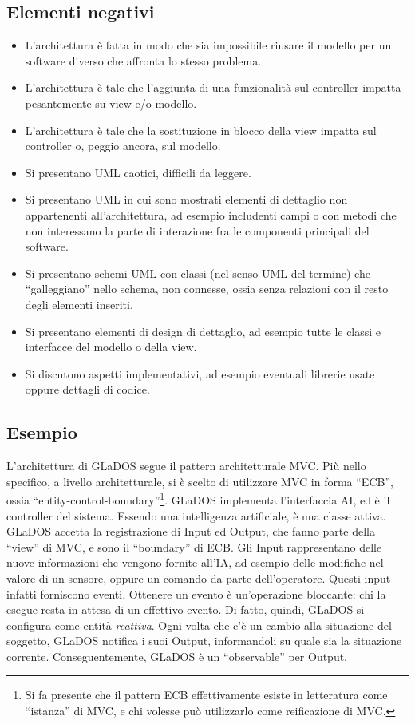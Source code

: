 \documentclass[a4paper,12pt]{report}
\begin{document}
\subsection*{Elementi negativi}
\begin{itemize}
 \item L'architettura è fatta in modo che sia impossibile riusare il modello per un software diverso che affronta lo stesso problema.
 \item L'architettura è tale che l'aggiunta di una funzionalità sul controller impatta pesantemente su view e/o modello.
 \item L'architettura è tale che la sostituzione in blocco della view impatta sul controller o, peggio ancora, sul modello.
 \item Si presentano UML caotici, difficili da leggere.
 \item Si presentano UML in cui sono mostrati elementi di dettaglio non appartenenti all'architettura, ad esempio includenti campi o con metodi che non interessano la parte di interazione fra le componenti principali del software.
 \item Si presentano schemi UML con classi (nel senso UML del termine) che ``galleggiano'' nello schema, non connesse, ossia senza relazioni con il resto degli elementi inseriti.
 \item Si presentano elementi di design di dettaglio, ad esempio tutte le classi e interfacce del modello o della view.
 \item Si discutono aspetti implementativi, ad esempio eventuali librerie usate oppure dettagli di codice.
\end{itemize}

\subsection*{Esempio}

L'architettura di GLaDOS segue il pattern architetturale MVC.
%
Più nello specifico, a livello architetturale, si è scelto di utilizzare MVC in forma ``ECB'', ossia ``entity-control-boundary''\footnote{
Si fa presente che il pattern ECB effettivamente esiste in letteratura come ``istanza'' di MVC, e chi volesse può utilizzarlo come reificazione di MVC.
}.
%
GLaDOS implementa l'interfaccia AI, ed è il controller del sistema.
Essendo una intelligenza artificiale, è una classe attiva.
%
GLaDOS accetta la registrazione di Input ed Output, che fanno parte della ``view'' di MVC, e sono il ``boundary'' di ECB.
Gli Input rappresentano delle nuove informazioni che vengono fornite all'IA, ad esempio delle modifiche nel valore di un sensore, oppure un comando da parte dell'operatore.
Questi input infatti forniscono eventi.
Ottenere un evento è un'operazione bloccante: chi la esegue resta in attesa di un effettivo evento.
Di fatto, quindi, GLaDOS si configura come entità \textit{reattiva}.
Ogni volta che c'è un cambio alla situazione del soggetto, GLaDOS notifica i suoi Output,
informandoli su quale sia la situazione corrente.
%
Conseguentemente, GLaDOS è un ``observable'' per Output.
\end{document}
